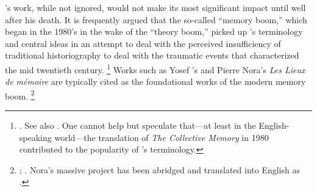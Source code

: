 \halbwachs's work, while not ignored, would not make its most significant impact until well after his death. It is frequently argued that the so-called ``memory boom,'' which began in the 1980's in the wake of the ``theory boom,'' picked up \halbwachs's terminology and central ideas in an attempt to deal with the perceived insufficiency of traditional historiography to deal with the traumatic events that characterized the mid twentieth century.%
    \footnote{%
        \Cite[1--2]{galinsky_galinsky2016}. See also 
        \cite[29--36]{olick_olick-etal2011}. One cannot help but speculate that---at least in the English-speaking world---the translation of \emph{The Collective Memory} in 1980 contributed to the popularity of \halbwachs's terminology.}
%
Works such as Yosef \yerushalmi's  and Pierre Nora's \emph{Les Lieux de mémoire} are typically cited as the foundational works of the modern memory boom.%
    \footnote{%
        \Cite[112--113]{klein2011};
        \cite{yerushalmi1989}. Nora's massive project has been abridged and translated into English as
        \cite{nora1996}.}

